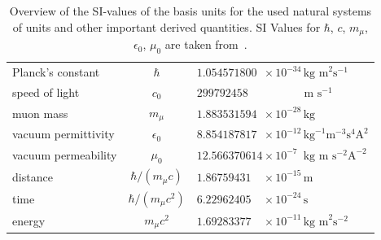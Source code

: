 \begin{table}[h]
\caption{\label{tab:units}Overview of the SI-values of the basis units for the used natural systems of units and other important derived quantities. SI Values for $\hbar$, $c$, $m_\mu$, $\epsilon_0$, $\mu_0$ are taken from~\cite{codata2016}.}
\centering\setcellgapes{4pt}\makegapedcells
\begin{tabular}{lc|ll}
\\
Planck's constant &$\hbar$ & \multicolumn{2}{l}{$1.054571800 \phantom{1}\times 10^{-34} \,\text{kg m}^2 \text{s}^{-1}$} \\
speed of light &$c_0$ & \multicolumn{2}{l}{$299792458\phantom{1} \,\,\phantom{\times 1001 ^{-34}} \text{m s}^{-1}$}\\
muon mass &$m_\mu$ & \multicolumn{2}{l}{$1.883531594\phantom{1} \times 10^{-28} \,\text{kg}$}\\
vacuum permittivity &$\epsilon_0$ & \multicolumn{2}{l}{$8.854187817\phantom{1} \times 10^{-12} \,  \text{kg}^{-1} \text{m}^{-3}\text{s}^4\text{A}^2$}\\
vacuum permeability &$\mu_0$ & \multicolumn{2}{l}{$12.566370614 \times 10^{-7\phantom{1}} \,\text{kg m} \text{ s}^{-2}\text{A}^{-2}$}\\[15pt]
distance & $\hbar/(m_\mu c)$ & $1.86759431\phantom{11}\times 10^{-15}\,\text{m}$\\
time & $\hbar /(m_\mu c^2)$ & $6.22962405\phantom{11}\times 10^{-24}\,\text{s}$\\
energy & $m_\mu c^2$ & $1.69283377\phantom{11}\times 10^{-11}\,\text{kg m}^2\text{s}^{-2}$\\
\end{tabular}
\end{table}
\clearpage
